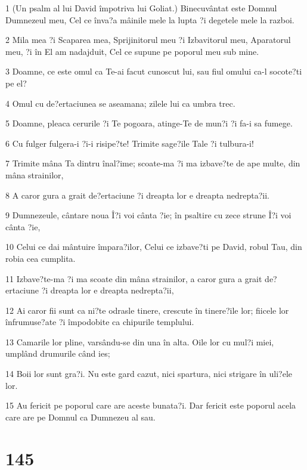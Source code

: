 \par 1 (Un psalm al lui David împotriva lui Goliat.) Binecuvântat este Domnul Dumnezeul meu, Cel ce înva?a mâinile mele la lupta ?i degetele mele la razboi.
\par 2 Mila mea ?i Scaparea mea, Sprijinitorul meu ?i Izbavitorul meu, Aparatorul meu, ?i în El am nadajduit, Cel ce supune pe poporul meu sub mine.
\par 3 Doamne, ce este omul ca Te-ai facut cunoscut lui, sau fiul omului ca-l socote?ti pe el?
\par 4 Omul cu de?ertaciunea se aseamana; zilele lui ca umbra trec.
\par 5 Doamne, pleaca cerurile ?i Te pogoara, atinge-Te de mun?i ?i fa-i sa fumege.
\par 6 Cu fulger fulgera-i ?i-i risipe?te! Trimite sage?ile Tale ?i tulbura-i!
\par 7 Trimite mâna Ta dintru înal?ime; scoate-ma ?i ma izbave?te de ape multe, din mâna strainilor,
\par 8 A caror gura a grait de?ertaciune ?i dreapta lor e dreapta nedrepta?ii.
\par 9 Dumnezeule, cântare noua Î?i voi cânta ?ie; în psaltire cu zece strune Î?i voi cânta ?ie,
\par 10 Celui ce dai mântuire împara?ilor, Celui ce izbave?ti pe David, robul Tau, din robia cea cumplita.
\par 11 Izbave?te-ma ?i ma scoate din mâna strainilor, a caror gura a grait de?ertaciune ?i dreapta lor e dreapta nedrepta?ii,
\par 12 Ai caror fii sunt ca ni?te odrasle tinere, crescute în tinere?ile lor; fiicele lor înfrumuse?ate ?i împodobite ca chipurile templului.
\par 13 Camarile lor pline, varsându-se din una în alta. Oile lor cu mul?i miei, umplând drumurile când ies;
\par 14 Boii lor sunt gra?i. Nu este gard cazut, nici spartura, nici strigare în uli?ele lor.
\par 15 Au fericit pe poporul care are aceste bunata?i. Dar fericit este poporul acela care are pe Domnul ca Dumnezeu al sau.

\chapter{145}

